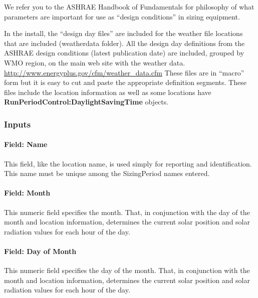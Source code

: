 We refer you to the ASHRAE Handbook of Fundamentals for philosophy of what parameters are important for use as ``design conditions'' in sizing equipment.

\begin{callout}
  In the install, the ``design day files'' are included for the weather file locations that are included (weatherdata folder). All the design day definitions from the ASHRAE design conditions (latest publication date) are included, grouped by WMO region, on the main web site with the weather data. \url{http://www.energyplus.gov/cfm/weather_data.cfm} These files are in ``macro'' form but it is easy to cut and paste the appropriate definition segments. These files include the location information as well as some locations have \textbf{RunPeriodControl:DaylightSavingTime} objects.
\end{callout}

\subsubsection{Inputs}\label{inputs-1-024}

\paragraph{Field: Name}\label{field-name-1-023}

This field, like the location name, is used simply for reporting and identification. This name must be unique among the SizingPeriod names entered.

\paragraph{Field: Month}\label{field-month}

This numeric field specifies the month. That, in conjunction with the day of the month and location information, determines the current solar position and solar radiation values for each hour of the day.

\paragraph{Field: Day of Month}\label{field-day-of-month}

This numeric field specifies the day of the month. That, in conjunction with the month and location information, determines the current solar position and solar radiation values for each hour of the day.

